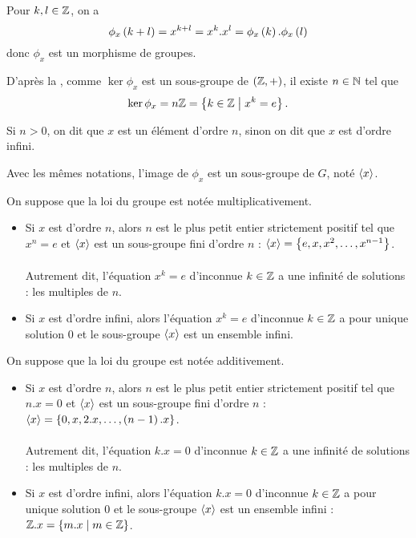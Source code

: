 \begin{dem}
Pour \(k,l\in\mathbb{Z}\), on a \[\phi_x\left(k+l\right)=x^{k+l}=x^k.x^l=\phi_x\left(k\right).\phi_x\left(l\right)\] donc \(\phi_x\) est un morphisme de groupes.

D'après la , comme \(\ker\phi_x\) est un sous-groupe de \(\groupe{\Z}\), il existe \(n\in\mathbb{N}\) tel que \[\ker\phi_x=n\mathbb{Z}=\left\lbrace k\in\mathbb{Z}\;\middle|\; x^k=e\right\rbrace.\]
\end{dem}

Si \(n>0\), on dit que \(x\) est un élément d'ordre \(n\), sinon on dit que \(x\) est d'ordre infini.

Avec les mêmes notations, l'image de \(\phi_x\) est un sous-groupe de \(G\), noté \(\langle x\rangle\).

\begin{prop}
On suppose que la loi du groupe est notée multiplicativement.

\begin{itemize}
    \item Si \(x\) est d'ordre \(n\), alors \(n\) est le plus petit entier strictement positif tel que \(x^n=e\) et \(\langle x\rangle\) est un sous-groupe fini d'ordre \(n\) : \(\langle x\rangle=\left\lbrace e,x,x^2,\dots,x^{n-1}\right\rbrace\). \\\\ Autrement dit, l'équation \(x^k=e\) d'inconnue \(k\in\mathbb{Z}\) a une infinité de solutions : les multiples de \(n\). \\
    \item Si \(x\) est d'ordre infini, alors l'équation \(x^k=e\) d'inconnue \(k\in\mathbb{Z}\) a pour unique solution \(0\) et le sous-groupe \(\langle x\rangle\) est un ensemble infini.
\end{itemize}
\end{prop}

\begin{prop}
On suppose que la loi du groupe est notée additivement.

\begin{itemize}
    \item Si \(x\) est d'ordre \(n\), alors \(n\) est le plus petit entier strictement positif tel que \(n.x=0\) et \(\langle x\rangle\) est un sous-groupe fini d'ordre \(n\) : \(\langle x\rangle=\left\lbrace0,x,2.x,\dots,\left(n-1\right).x\right\rbrace\). \\\\ Autrement dit, l'équation \(k.x=0\) d'inconnue \(k\in\mathbb{Z}\) a une infinité de solutions : les multiples de \(n\). \\
    \item Si \(x\) est d'ordre infini, alors l'équation \(k.x=0\) d'inconnue \(k\in\mathbb{Z}\) a pour unique solution \(0\) et le sous-groupe \(\langle x\rangle\) est un ensemble infini : \(\mathbb{Z}.x=\left\lbrace m.x\;\middle|\; m\in\mathbb{Z}\right\rbrace\).
\end{itemize}
\end{prop}

